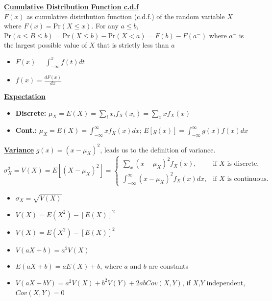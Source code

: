 \documentclass[10pt,landscape]{article}
\begin{document}
\begin{multicols*}{3}
\textbf{\underline{Cumulative Distribution Function c.d.f}} \\ 
$F(x)$ as cumulative distribution function (c.d.f.) of the random variable $X$ where $F(x)=\text{Pr}(X≤x)$.
For any $a≤b$, $\text{Pr}(a≤B≤b)=\text{Pr}(X≤b)-\text{Pr}(X<a)=F(b)-F(a^-)$
where $a^-$ is the largest possible value of $X$ that is strictly less than $a$
\begin{multicols*}{2}
    \begin{itemize}[topsep=0pt,noitemsep,wide=0pt, leftmargin=\dimexpr{} + 2\relax]
        \item $F(x)=\int^x_{-\infty}f(t)dt$
        \item $f(x)=\frac{dF(x)}{dx}$
    \end{itemize}
\end{multicols*}

\textbf{\underline{Expectation}} 
\begin{itemize}[topsep=0pt,noitemsep,wide=0pt, leftmargin=\dimexpr{} + 2\relax]
    \item \textbf{Discrete:} $\mu_X=E(X)=\sum_{i}x_if_X(x_i)=\sum_xxf_X(x)$
    \item \textbf{Cont.:} $\mu_X=E(X)=\int_{-\infty}^\infty xf_X(x)dx$; $E[g(x)] = \int_{-\infty}^\infty g(x)f(x)dx$ 
\end{itemize}
\textbf{\underline{Variance}}
$g(x)=(x-\mu_X)^2$, leads us to the definition of variance.
$\sigma_X^2=V(X)=E[(X-\mu_X)^2]=\begin{cases}\sum_x(x-\mu_X)^2f_X(x),&\text{if }X \text{ is discrete,}\\\int_{-\infty}^{\infty}(x-\mu_X)^2f_X(x)dx,&\text{if }X\text{ is continuous.}\end{cases}$

\begin{multicols*}{2}
\begin{itemize}[topsep=0pt,noitemsep,wide=0pt, leftmargin=\dimexpr{} + 2\relax]
    \item $\sigma_X=\sqrt{V(X)}$
    \item $V(X)=E(X^2)-[E(X)]^2$    
    \item $V(X)=E(X^2)-[E(X)]^2$
    \item $V(aX+b)=a^2V(X)$
    \item $E(aX+b)=aE(X)+b$, where $a$ and $b$ are constants
    \item $V(aX+bY)=a^2V(X)+b^2V(Y)+2abCov(X,Y)$, if $X$,$Y$ independent, $Cov(X,Y)=0$
\end{itemize}
\end{multicols*}


\end{multicols*}
\end{document}
